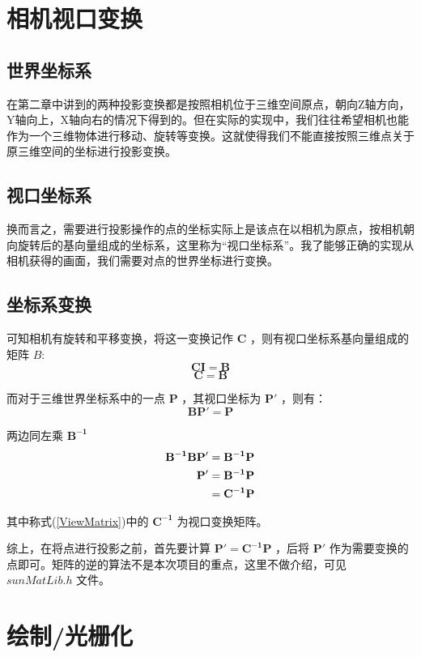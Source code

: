 \documentclass[12pt,oneside,a4paper]{ctexart}
\begin{document}
\section{相机视口变换}
\subsection{世界坐标系}
在第二章中讲到的两种投影变换都是按照相机位于三维空间原点，朝向Z轴方向，Y轴向上，X轴向右的情况下得到的。但在实际的实现中，我们往往希望相机也能作为一个三维物体进行移动、旋转等变换。这就使得我们不能直接按照三维点关于原三维空间的坐标进行投影变换。
\subsection{视口坐标系}
换而言之，需要进行投影操作的点的坐标实际上是该点在以相机为原点，按相机朝向旋转后的基向量组成的坐标系，这里称为“视口坐标系”。我了能够正确的实现从相机获得的画面，我们需要对点的世界坐标进行变换。
\subsection{坐标系变换}
可知相机有旋转和平移变换，将这一变换记作 $\mathbf{C}$ ，则有视口坐标系基向量组成的矩阵 $B$:
\begin{equation*}
	\mathbf{C}\mathbf{I}=\mathbf{B}
\end{equation*}
\begin{equation*}
	\mathbf{C}=\mathbf{B}
\end{equation*}

而对于三维世界坐标系中的一点 $\mathbf{P}$ ，其视口坐标为 $\mathbf{P'}$ ，则有：
\begin{equation*}
	\mathbf{BP'}=\mathbf{P}
\end{equation*}

两边同左乘 $\mathbf{B^{-1}}$
\begin{align}
	\mathbf{B^{-1}BP'} & =\mathbf{B^{-1}P}\notag \\
	\mathbf{P'}        & =\mathbf{B^{-1}P}\notag \\
	                   & =\mathbf{C^{-1}P}
	\label{ViewMatrix}
\end{align}

其中称式(\ref{ViewMatrix})中的 $\mathbf{C^{-1}}$ 为视口变换矩阵。

综上，在将点进行投影之前，首先要计算 $\mathbf{P'}=\mathbf{C^{-1}P}$ ，后将 $\mathbf{P'}$ 作为需要变换的点即可。矩阵的逆的算法不是本次项目的重点，这里不做介绍，可见 $sunMatLib.h$ 文件。
\section{绘制/光栅化}
\end{document}
